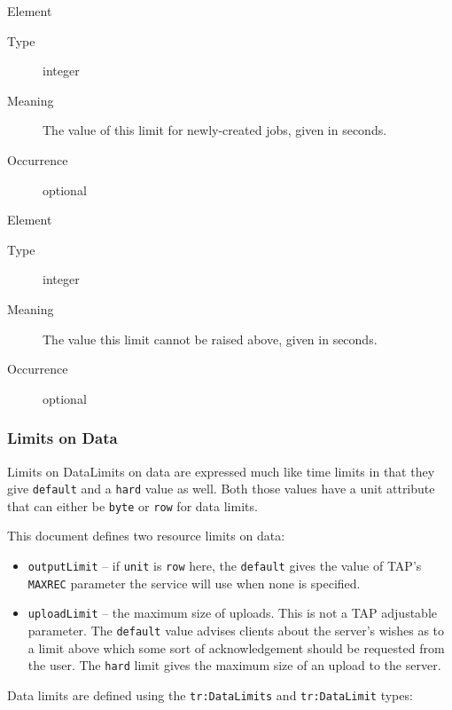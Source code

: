 \documentclass{ivoa}
\begin{document}
\begin{bigdescription}\item[Element \xmlel{default}]
\begin{description}
\item[Type\quad] integer
\item[Meaning\quad] 
          The value of this limit for newly-created jobs, given in seconds.
          
\item[Occurrence\quad] optional

\end{description}
\item[Element \xmlel{hard}]
\begin{description}
\item[Type\quad] integer
\item[Meaning\quad] 
          The value this limit cannot be raised above, given in seconds.
          
\item[Occurrence\quad] optional

\end{description}


\end{bigdescription}



\subsubsection{Limits on Data}
Limits on DataLimits on data are expressed much like time limits in that they give
\texttt{default} and a \texttt{hard} value as well.  
Both those values have a unit attribute that can either be \texttt{byte}
or \texttt{row} for data limits.

This document defines two resource limits on data:


\begin{itemize}

\item \texttt{outputLimit} -- if \texttt{unit} is \texttt{row} here,
the \texttt{default} gives the
value of TAP's \texttt{MAXREC} parameter the service will use when none
is specified.{}

\item \texttt{uploadLimit} -- the maximum size of uploads.  This 
is not a TAP adjustable parameter.  The \texttt{default} value
advises clients about the server's wishes as to a limit above which
some sort of acknowledgement should be requested from the user.  The 
\texttt{hard} limit gives the maximum size of an upload to the 
server.{}

\end{itemize}
Data limits are defined using the \texttt{tr:DataLimits}
and \texttt{tr:DataLimit} types:
\end{document}
